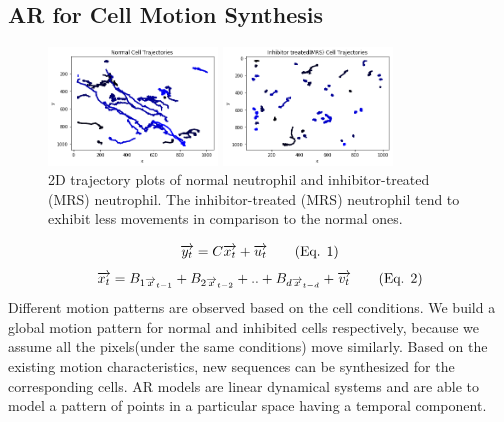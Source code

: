 \documentclass{article}
\newcommand\numberthis{\addtocounter{equation}{1}\tag{Eq. \theequation}}
\newcommand{\squeezeup}{\vspace{-2.5mm}}
\begin{document}
\subsection{AR for Cell Motion Synthesis}
\squeezeup
\squeezeup
\begin{figure} [htb]
\begin{minipage}[b]{.48\linewidth}
  \centering
  \centerline{\includegraphics[width=4.5cm]{normaltrajectories}}
  \vspace{-0.3cm}
\end{minipage}
\hfill
\begin{minipage}[b]{0.48\linewidth}
  \centering
  \centerline{\includegraphics[width=4.5cm]{mrstrajectories}}
  \vspace{-0.3cm}
\end{minipage}
%
\caption{2D trajectory plots of normal neutrophil and inhibitor-treated (MRS) neutrophil. The inhibitor-treated (MRS) neutrophil tend to exhibit less movements in comparison to the normal ones.}
\vspace{-0.5cm}
\label{fig:res4}
%
\end{figure}
\squeezeup
\begin{equation*} 
\overrightarrow{y_{t}} = C\overrightarrow{x_{t}} + \overrightarrow{u_{t}} \numberthis \label{eqn3}
\end{equation*}
\begin{equation*} 
\overrightarrow{x_{t}} = B_{1\overrightarrow{x}_{t-1}} + B_{2\overrightarrow{x}_{t-2}}+..+B_{d\overrightarrow{x}_{t-d}}+\overrightarrow{v_{t}} \numberthis \label{eqn4}
\end{equation*}
\label{ssec:submethod2}
\vspace{-0.5mm}
Different motion patterns are observed based on the cell conditions. We build a global motion pattern for normal and inhibited cells respectively, because we assume all the pixels(under the same conditions) move similarly. Based on the existing motion characteristics, new sequences can be synthesized for the corresponding cells. AR models are linear dynamical systems and are able to model a pattern of points in a particular space having a temporal component. 
\end{document}
